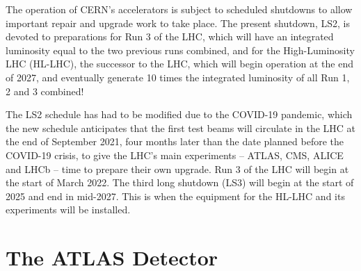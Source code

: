 The operation of CERN’s accelerators is subject to scheduled shutdowns 
to allow important repair and upgrade work to take place. 
The present shutdown, LS2, is devoted to preparations for Run 3 of the LHC, 
which will have an integrated luminosity equal to the two previous runs combined, 
and for the High-Luminosity LHC (HL-LHC), 
the successor to the LHC, which will begin operation at the end of 2027,
and eventually generate 10 times the integrated luminosity of
all Run 1, 2 and 3 combined!

The LS2 schedule has had to be modified due to the COVID-19 pandemic, 
which the new schedule anticipates that the first test beams will 
circulate in the LHC 
at the end of September 2021, four months later than the date 
planned before the COVID-19 crisis, 
to give the LHC’s main experiments – ATLAS, CMS, ALICE and LHCb – 
time to prepare their own upgrade. 
Run 3 of the LHC will begin at the start of March 2022.
The third long shutdown (LS3) will begin at the 
start of 2025 and end in mid-2027. 
This is when the equipment for the HL-LHC and 
its experiments will be installed. 






\section{The ATLAS Detector}



